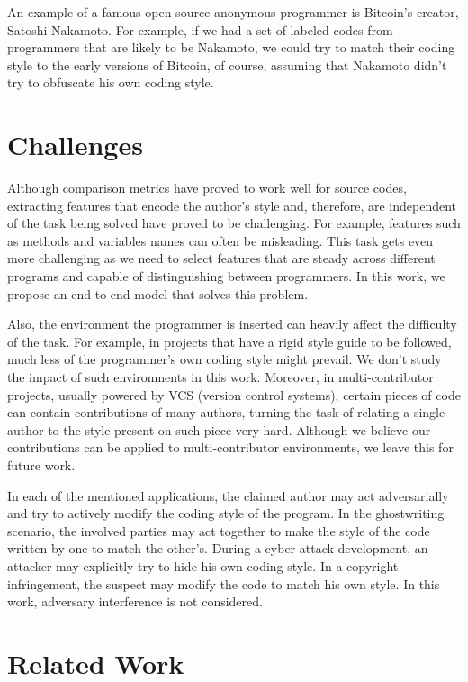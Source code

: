 An example of a famous open source anonymous programmer is Bitcoin's creator, Satoshi Nakamoto. For example, if we had a set of labeled codes from programmers that are likely to be Nakamoto, we could try to match their coding style to the early versions of Bitcoin, of course, assuming that Nakamoto didn't try to obfuscate his own coding style.

\section{Challenges}

Although comparison metrics have proved to work well for source codes, extracting features that encode the author's style and, therefore, are independent of the task being solved have proved to be challenging. For example, features such as methods and variables names can often be misleading. This task gets even more challenging as we need to select features that are steady across different programs and capable of distinguishing between programmers. In this work, we propose an end-to-end model that solves this problem.

Also, the environment the programmer is inserted can heavily affect the difficulty of the task. For example, in projects that have a rigid style guide to be followed, much less of the programmer's own coding style might prevail. We don't study the impact of such environments in this work. Moreover, in multi-contributor projects, usually powered by VCS (version control systems), certain pieces of code can contain contributions of many authors, turning the task of relating a single author to the style present on such piece very hard. Although we believe our contributions can be applied to multi-contributor environments, we leave this for future work.

In each of the mentioned applications, the claimed author may act adversarially and try to actively modify the coding style of the program. In the ghostwriting scenario, the involved parties may act together to make the style of the code written by one to match the other's. During a cyber attack development, an attacker may explicitly try to hide his own coding style. In a copyright infringement, the suspect may modify the code to match his own style. In this work, adversary interference is not considered.

\section{Related Work}


